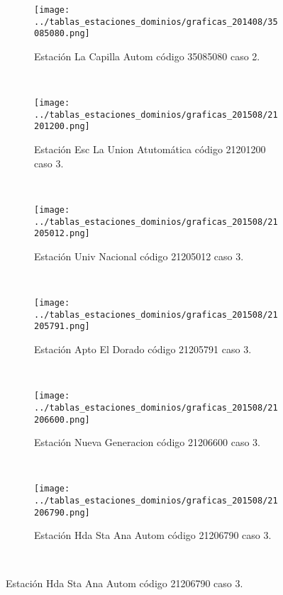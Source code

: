 \begin{figure}[H]
\centering
\begin{subfigure}[normla]{0.4\textwidth}
\texttt{[image: ../tablas\_estaciones\_dominios/graficas\_201408/35085080.png]}
\caption{Estación La Capilla Autom código 35085080 caso 2.}
\end{subfigure}
~
\begin{subfigure}[normla]{0.4\textwidth}
\texttt{[image: ../tablas\_estaciones\_dominios/graficas\_201508/21201200.png]}
\caption{Estación Esc La Union Atutomática código 21201200 caso 3.}
\end{subfigure}
~
\begin{subfigure}[normla]{0.4\textwidth}
\texttt{[image: ../tablas\_estaciones\_dominios/graficas\_201508/21205012.png]}
\caption{Estación Univ Nacional código 21205012 caso 3.}
\end{subfigure}
~
\begin{subfigure}[normla]{0.4\textwidth}
\texttt{[image: ../tablas\_estaciones\_dominios/graficas\_201508/21205791.png]}
\caption{Estación Apto El Dorado código 21205791 caso 3.}
\end{subfigure}
~
\begin{subfigure}[normla]{0.4\textwidth}
\texttt{[image: ../tablas\_estaciones\_dominios/graficas\_201508/21206600.png]}
\caption{Estación Nueva Generacion código 21206600 caso 3.}
\end{subfigure}
~
\begin{subfigure}[normla]{0.4\textwidth}
\texttt{[image: ../tablas\_estaciones\_dominios/graficas\_201508/21206790.png]}
\caption{Estación Hda Sta Ana Autom código 21206790 caso 3.}
\end{subfigure}
~
\end{figure}
 
